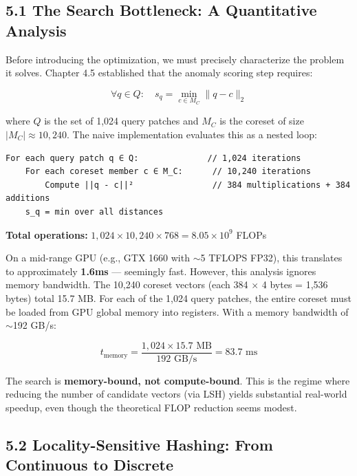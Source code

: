 \documentclass[12pt, a4paper, oneside]{report}
\begin{document}
\subsection{5.1 The Search Bottleneck: A Quantitative Analysis}\label{the-search-bottleneck-a-quantitative-analysis}

Before introducing the optimization, we must precisely characterize the problem it solves. Chapter 4.5 established that the anomaly scoring step requires:

\[\forall q \in Q: \quad s_q = \min_{c \in M_C} \|q - c\|_2\]

where \(Q\) is the set of 1,024 query patches and \(M_C\) is the coreset of size \(|M_C| \approx 10{,}240\). The naive implementation evaluates this as a nested loop:

\begin{lstlisting}
For each query patch q ∈ Q:              // 1,024 iterations
    For each coreset member c ∈ M_C:      // 10,240 iterations
        Compute ||q - c||²                // 384 multiplications + 384 additions
    s_q = min over all distances
\end{lstlisting}

\textbf{Total operations:} \(1{,}024 \times 10{,}240 \times 768 = 8.05 \times 10^9\) FLOPs

On a mid-range GPU (e.g., GTX 1660 with ${\sim}$5 TFLOPS FP32), this translates to approximately \textbf{1.6ms} --- seemingly fast. However, this analysis ignores memory bandwidth. The 10,240 coreset vectors (each 384 $\times$ 4 bytes = 1,536 bytes) total 15.7 MB. For each of the 1,024 query patches, the entire coreset must be loaded from GPU global memory into registers. With a memory bandwidth of ${\sim}$192 GB/s:

\[t_{\text{memory}} = \frac{1{,}024 \times 15.7 \text{ MB}}{192 \text{ GB/s}} = 83.7 \text{ ms}\]

The search is \textbf{memory-bound, not compute-bound}. This is the regime where reducing the number of candidate vectors (via LSH) yields substantial real-world speedup, even though the theoretical FLOP reduction seems modest.

\bigskip\noindent\hrulefill\bigskip

\subsection{5.2 Locality-Sensitive Hashing: From Continuous to Discrete}\label{locality-sensitive-hashing-from-continuous-to-discrete}
\end{document}
